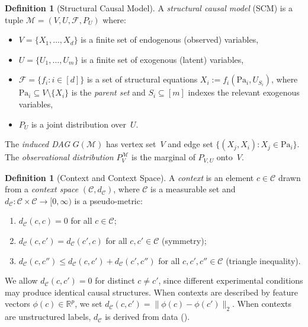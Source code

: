 \documentclass[11pt,a4paper]{article}
\theoremstyle{definition}
\newtheorem{definition}[theorem]{Definition}
\newcommand{\cC}{\mathcal{C}}                 %
\newcommand{\cM}{\mathcal{M}}                 %
\newcommand{\cF}{\mathcal{F}}                 %
\newcommand{\Pa}{\mathrm{Pa}}                 %
\newcommand{\dC}{d_{\cC}}                     %
\newcommand{\R}{\mathbb{R}}                   %
\begin{document}
\begin{definition}[Structural Causal Model]\label{def:scm}
A \emph{structural causal model} (SCM) is a tuple
$\cM = (V, U, \cF, P_U)$ where:
\begin{itemize}[nosep]
  \item $V = \{X_1, \ldots, X_d\}$ is a finite set of endogenous
        (observed) variables,
  \item $U = \{U_1, \ldots, U_m\}$ is a finite set of exogenous (latent)
        variables,
  \item $\cF = \{f_i : i \in [d]\}$ is a set of structural equations
        $X_i := f_i(\Pa_i, U_{S_i})$, where
        $\Pa_i \subseteq V \setminus \{X_i\}$ is the \emph{parent set}
        and $S_i \subseteq [m]$ indexes the relevant exogenous variables,
  \item $P_U$ is a joint distribution over~$U$.
\end{itemize}
The \emph{induced DAG} $G(\cM)$ has vertex set~$V$ and edge set
$\{(X_j, X_i) : X_j \in \Pa_i\}$.  The \emph{observational distribution}
$P_V^{\cM}$ is the marginal of $P_{V,U}$ onto~$V$.
\end{definition}

\begin{definition}[Context and Context Space]\label{def:context}
A \emph{context} is an element $c \in \cC$ drawn from a \emph{context
space} $(\cC, \dC)$, where $\cC$ is a measurable set and
$\dC \colon \cC \times \cC \to [0, \infty)$ is a pseudo-metric:
\begin{enumerate}[nosep,label=(\roman*)]
  \item $\dC(c, c) = 0$ for all $c \in \cC$;
  \item $\dC(c, c') = \dC(c', c)$ for all $c, c' \in \cC$  (symmetry);
  \item $\dC(c, c'') \le \dC(c, c') + \dC(c', c'')$ for all
        $c, c', c'' \in \cC$ (triangle inequality).
\end{enumerate}
We allow $\dC(c, c') = 0$ for distinct $c \ne c'$, since different
experimental conditions may produce identical causal structures.  When
contexts are described by feature vectors $\phi(c) \in \R^p$, we set
$\dC(c, c') = \|\phi(c) - \phi(c')\|_2$.  When contexts are unstructured
labels, $\dC$ is derived from data ().
\end{definition}
\end{document}

